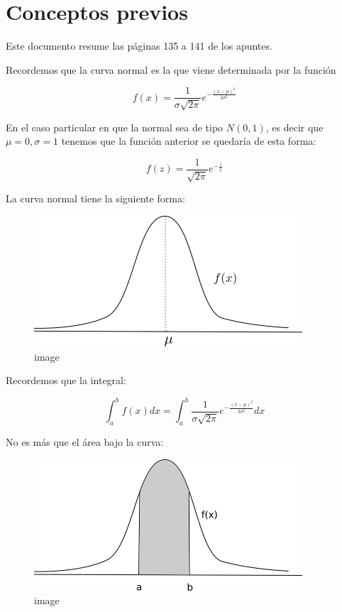 \hypertarget{conceptos-previos}{%
\section{Conceptos previos}\label{conceptos-previos}}

Este documento resume las páginas 135 a 141 de los apuntes.

Recordemos que la curva normal es la que viene determinada por la
función

\[f(x) = \frac{1}{\sigma \sqrt{2\pi}} e^{-\frac{(x-\mu)^2}{2\sigma^2}}\]

En el caso particular en que la normal sea de tipo \(N(0, 1)\), es decir
que \(\mu = 0, \sigma = 1\) tenemos que la función anterior se quedaría
de esta forma:

\[\label{fz_normal}
 f(z) = \frac{1}{\sqrt{2\pi}} e^{-\frac{z}{2}}\]

La curva normal tiene la siguiente forma:

\begin{figure}
\centering
\includegraphics{normal.png}
\caption{image}
\end{figure}

Recordemos que la integral:

\[\label{int-normal}
    \int^b_a f(x) dx = \int^b_a \frac{1}{\sigma \sqrt{2\pi}} e^{-\frac{(x-\mu)^2}{2\sigma^2}} dx\]

No es más que el área bajo la curva:

\begin{figure}
\centering
\includegraphics{drawing_ab.png}
\caption{image}
\end{figure}

